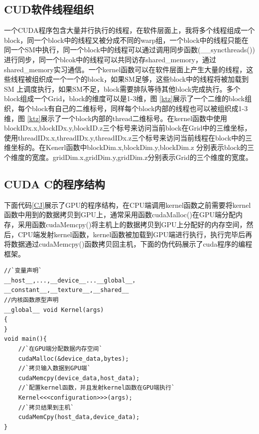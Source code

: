\subsection{CUD软件线程组织}

一个CUDA程序包含大量并行执行的线程，在软件层面上，我将多个线程组成一个block，同一个block中的线程又被分成不同的warp组，一个block中的线程只能在同一个SM中执行，同一个block中的线程可以通过调用同步函数(\_\_syncthreads())进行同步，同一个blcok中的线程可以共同访存shared\_memory，通过shared\_memory实习通信。一个kernel函数可以在软件层面上产生大量的线程，这些线程被组织成一个一个的block，如果SM足够，这些block中的线程将被加载到SM 上调度执行，如果SM不足，block需要排队等待其他block完成执行。多个block组成一个Grid，block的维度可以是1-3维，图 \ref{ktz}展示了一个二维的block组织，每个block有自己的二维标号，同样每个block内部的线程也可以被组织成1-3维，图 \ref{ktz}展示了一个block内部的thread二维标号。在kernel函数中使用blockIDx.x,blockIDx.y,blockID.z三个标号来访问当前block在Grid中的三维坐标，使用threadIDx.x,threadIDx.y,threadIDx.z三个标号来访问当前线程在block中的三维坐标的。在Kenerl函数中blockDim.x,blockDim.y,blockDim.z 分别表示block的三个维度的宽度。gridDim.x,gridDim.y,gridDim.z分别表示Grid的三个维度的宽度。

\subsection{CUDA C的程序结构}

下面代码\ref{CJ}展示了GPU的程序结构，在CPU端调用kernel函数之前需要将kernel函数中用到的数据拷贝到GPU上，通常采用函数cudaMalloc()在GPU端分配内存，采用函数cudaMemcpy()将主机上的数据拷贝到GPU上分配好的内存空间，然后，CPU端发射kernel函数，kernel函数被加载到GPU端进行执行，执行完毕后再将数据通过cudaMemcpy()函数拷贝回主机，下面的伪代码展示了cuda程序的编程框架。
\begin{lstlisting}[caption={CUDA程序结构},captionpos=b,firstnumber=1,label={CJ}]
//`变量声明`
__host__,...,__device__...__global__，
__constant__,__texture__,__shared__
//内核函数原型声明
__global__ void Kernel(args)
{
}
void main(){
    //`在GPU端分配数据内存空间`
    cudaMalloc(&device_data,bytes);
    //`拷贝输入数据到GPU端`
    cudaMemcpy(device_data,host_data);
    //`配置kernel函数，并且发射kernel函数在GPU端执行`
    Kernel<<<configuration>>>(args);
    //`拷贝结果到主机`
    cudaMemCpy(host_data,device_data);
}
\end{lstlisting}
